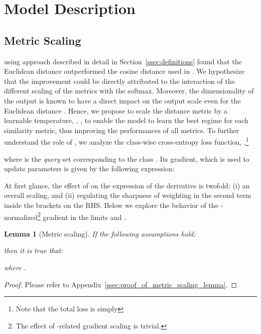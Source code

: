 \documentclass{article}
\newtheorem{lemma}{Lemma}
\begin{document}
\section{Model Description}\label{sec:model}

\subsection{Metric Scaling}\label{ssec:theory_metric_scaling}
\citet{snell2017prototypical} using approach described in detail in Section~\ref{ssec:definitions} found that the Euclidean distance outperformed the cosine distance used in \citet{vinyals2016matching}. We hypothesize that the improvement could be directly attributed to the interaction of the different scaling of the metrics with the softmax. Moreover, the dimensionality of the output is known to have a direct impact on the output scale even for the Euclidean distance \citep{vaswani2017attention}. Hence, we propose to scale the distance metric by a learnable temperature, , , to enable the model to learn the best regime for each similarity metric, thus improving the performances of all metrics. To further understand the role of , we analyze the class-wise cross-entropy loss function, ,\footnote{Note that the total loss is simply }

where  is the \emph{query} set corresponding to the class . Its gradient, which is used to update parameters  is given by the following expression:

At first glance, the effect of  on the expression of the derivative is twofold: (i) an overall scaling, and (ii) regulating the sharpness of weighting in the second term inside the brackets on the RHS. Below we explore the behavior of the -normalized\footnote{The effect of -related gradient scaling is trivial.}  gradient in the limits  and . 

\begin{lemma}[Metric scaling] \label{lem:metric_scaling}
If the following assumptions hold: 



then it is true that:

where . 
\end{lemma}
\begin{proof}
Please refer to Appendix~\ref{ssec:proof_of_metric_scaling_lemma}.
\end{proof}
  
\end{document}

